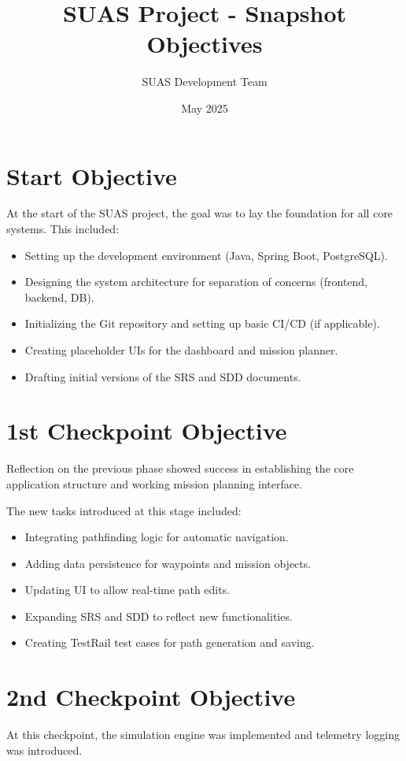 \documentclass{article}
\title{SUAS Project - Snapshot Objectives}
\author{SUAS Development Team}
\date{May 2025}
\begin{document}
\maketitle
\vspace{1cm}
\tableofcontents
\newpage

\section{Start Objective}
At the start of the SUAS project, the goal was to lay the foundation for all core systems. This included:
\begin{itemize}
    \item Setting up the development environment (Java, Spring Boot, PostgreSQL).
    \item Designing the system architecture for separation of concerns (frontend, backend, DB).
    \item Initializing the Git repository and setting up basic CI/CD (if applicable).
    \item Creating placeholder UIs for the dashboard and mission planner.
    \item Drafting initial versions of the SRS and SDD documents.
\end{itemize}

\section{1st Checkpoint Objective}
Reflection on the previous phase showed success in establishing the core application structure and working mission planning interface.

The new tasks introduced at this stage included:
\begin{itemize}
    \item Integrating pathfinding logic for automatic navigation.
    \item Adding data persistence for waypoints and mission objects.
    \item Updating UI to allow real-time path edits.
    \item Expanding SRS and SDD to reflect new functionalities.
    \item Creating TestRail test cases for path generation and saving.
\end{itemize}

\section{2nd Checkpoint Objective}
At this checkpoint, the simulation engine was implemented and telemetry logging was introduced.
\end{document}
